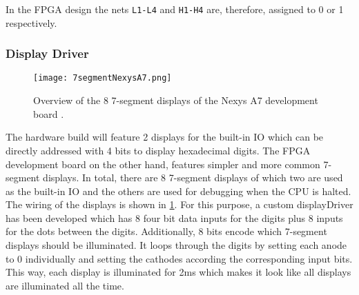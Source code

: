 In the \gls{FPGA} design the nets \texttt{L1-L4} and \texttt{H1-H4} are, therefore, assigned to 0 or 1 respectively.

\subsubsection{Display Driver}
\begin{figure}
  \centering
  \texttt{[image: 7segmentNexysA7.png]}
  \caption{Overview of the 8 7-segment displays of the Nexys A7 development board \cite{7segNexys}.}
  \label{fig:7segNexys}
\end{figure}
The hardware build will feature 2 displays for the built-in \gls{IO} which can be directly addressed with 4 bits to display hexadecimal digits.
The \gls{FPGA} development board on the other hand, features simpler and more common 7-segment displays.
In total, there are 8 7-segment displays of which two are used as the built-in \gls{IO} and the others are used for debugging when the \gls{CPU} is halted.
The wiring of the displays is shown in \cref{fig:7segNexys}.
For this purpose, a custom displayDriver has been developed which has 8 four bit data inputs for the digits plus 8 inputs for the dots between the digits.
Additionally, 8 bits encode which 7-segment displays should be illuminated.
It loops through the digits by setting each anode to 0 individually and setting the cathodes according the corresponding input bits.
This way, each display is illuminated for 2ms which makes it look like all displays are illuminated all the time.

